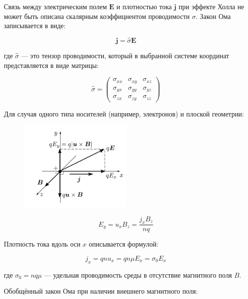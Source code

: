 Связь между электрическим полем \( \mathbf{E} \) и плотностью тока \( \mathbf{j} \) при эффекте Холла не может быть описана скалярным коэффициентом проводимости \( \sigma \). Закон Ома записывается в виде:

\begin{equation}
\mathbf{j} = \hat{\sigma} \mathbf{E}
\end{equation}

где \( \hat{\sigma} \) — это тензор проводимости, который в выбранной системе координат представляется в виде матрицы:

\begin{equation}
\hat{\sigma} =
\begin{pmatrix}
\sigma_{xx} & \sigma_{xy} & \sigma_{xz} \\
\sigma_{yx} & \sigma_{yy} & \sigma_{yz} \\
\sigma_{zx} & \sigma_{zy} & \sigma_{zz}
\end{pmatrix}
\end{equation}

Для случая одного типа носителей (например, электронов) и плоской геометрии:

\begin{figure}[H]
    \centering
    \includegraphics[width=0.5\textwidth]{pictures/r2.png}
\end{figure}

\begin{equation}
E_y = u_x B_z = \frac{j_x B_z}{nq}
\end{equation}

Плотность тока вдоль оси \( x \) описывается формулой:

\begin{equation}
j_x = qnu_x = qn\mu E_x = \sigma_0 E_x
\end{equation}

где \( \sigma_0 = nq\mu \) — удельная проводимость среды в отсутствие магнитного поля \( B \). 

Обобщённый закон Ома при наличии внешнего магнитного поля:


